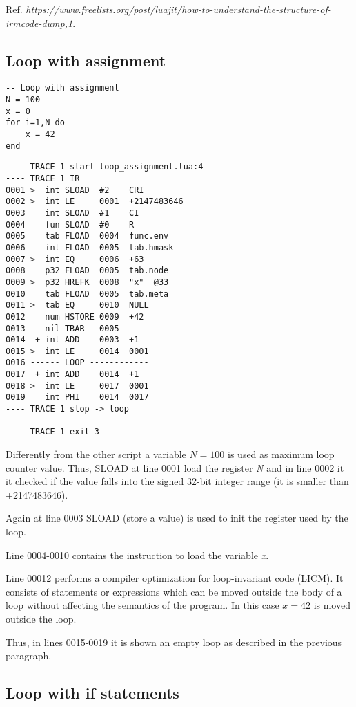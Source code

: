 Ref. \textit{https://www.freelists.org/post/luajit/how-to-understand-the-structure-of-irmcode-dump,1}.\\

\subsection{Loop with assignment}

\begin{lstlisting}[style=LuaStyle]
-- Loop with assignment
N = 100
x = 0
for i=1,N do
	x = 42
end
\end{lstlisting}

\begin{lstlisting}[style=DumpStyle]
---- TRACE 1 start loop_assignment.lua:4
---- TRACE 1 IR
0001 >  int SLOAD  #2    CRI
0002 >  int LE     0001  +2147483646
0003    int SLOAD  #1    CI
0004    fun SLOAD  #0    R
0005    tab FLOAD  0004  func.env
0006    int FLOAD  0005  tab.hmask
0007 >  int EQ     0006  +63 
0008    p32 FLOAD  0005  tab.node
0009 >  p32 HREFK  0008  "x"  @33
0010    tab FLOAD  0005  tab.meta
0011 >  tab EQ     0010  NULL
0012    num HSTORE 0009  +42 
0013    nil TBAR   0005
0014  + int ADD    0003  +1  
0015 >  int LE     0014  0001
0016 ------ LOOP ------------
0017  + int ADD    0014  +1  
0018 >  int LE     0017  0001
0019    int PHI    0014  0017
---- TRACE 1 stop -> loop

---- TRACE 1 exit 3
\end{lstlisting}

Differently from the other script a variable $N=100$ is used as maximum loop counter value. Thus, SLOAD at line 0001 load the register \textit{N} and in line 0002 it it checked if the value falls into the signed 32-bit integer range (it is smaller than +2147483646).

Again at line 0003 SLOAD (store a value) is used to init the register used by the loop.

Line 0004-0010 contains the instruction to load the variable \textit{x}.

Line 00012 performs a compiler optimization for loop-invariant code (LICM). It consists of statements or expressions which can be moved outside the body of a loop without affecting the semantics of the program. In this case $x=42$ is moved outside the loop.

Thus, in lines 0015-0019 it is shown an empty loop as described in the previous paragraph.\\

\subsection{Loop with if statements }




